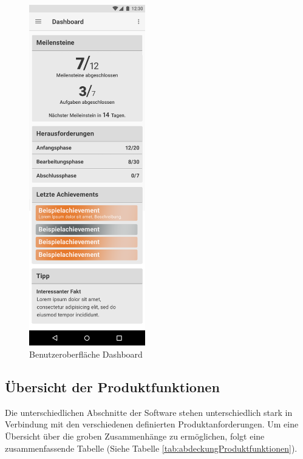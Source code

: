\documentclass[bibliography=totoc,listof=totoc,BCOR=5mm,DIV=12,oneside]{scrbook}
\begin{document}
\begin{figure}[H]
	\centering
	\includegraphics[width=0.45\textwidth,keepaspectratio]{Bilder/Prototyp/Dashboard.png}
	\caption{Benutzeroberfläche Dashboard}
	\label{img:dashboard}
\end{figure}


\newpage
\subsection{Übersicht der Produktfunktionen}
\par Die unterschiedlichen Abschnitte der Software stehen unterschiedlich stark in Verbindung mit den verschiedenen definierten Produktanforderungen. Um eine Übersicht über die groben Zusammenhänge zu ermöglichen, folgt eine zusammenfassende Tabelle (Siehe Tabelle \ref{tab:abdeckungProduktfunktionen}).
\bigskip
\end{document}
